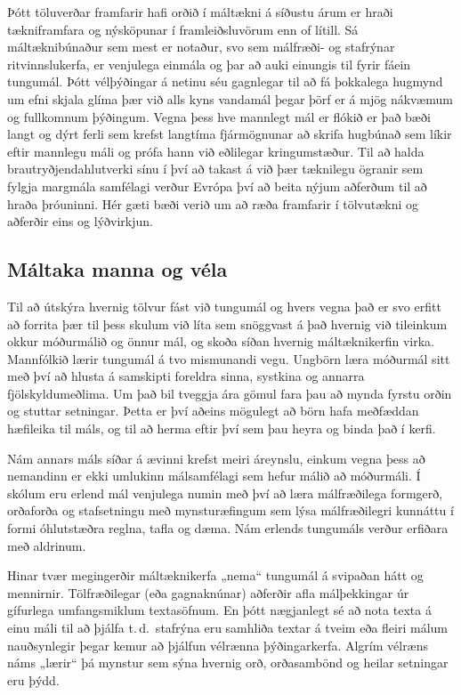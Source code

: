 \begin{multicols}{2}
Þótt töluverðar framfarir hafi orðið í máltækni á síðustu árum er hraði tækniframfara og nýsköpunar í framleiðsluvörum enn of lítill. Sá máltæknibúnaður sem mest er notaður, svo sem málfræði- og stafrýnar ritvinnslukerfa, er venjulega einmála og þar að auki einungis til fyrir fáein tungumál.
Þótt vélþýðingar á netinu séu gagnlegar til að fá þokkalega hugmynd um efni skjala glíma þær við alls kyns vandamál þegar þörf er á mjög nákvæmum og fullkomnum þýðingum. Vegna þess hve mannlegt mál er flókið er það bæði langt og dýrt ferli sem krefst langtíma fjármögnunar að skrifa hugbúnað sem líkir eftir mannlegu máli og prófa hann við eðlilegar kringumstæður. Til að halda brautryðjendahlutverki sínu í því að takast á við þær tæknilegu ögranir sem fylgja margmála samfélagi verður Evrópa því að beita nýjum aðferðum til að hraða þróuninni. Hér gæti bæði verið um að ræða framfarir í tölvutækni og aðferðir eins og lýðvirkjun.

\subsection{Máltaka manna og véla}

Til að útskýra hvernig tölvur fást við tungumál og hvers vegna það er svo erfitt að forrita þær til þess skulum við líta sem snöggvast á það hvernig við tileinkum okkur móðurmálið og önnur mál, og skoða síðan hvernig máltæknikerfin virka.
Mannfólkið lærir tungumál á tvo mismunandi vegu. Ungbörn læra móðurmál sitt með því að hlusta á samskipti foreldra sinna, systkina og annarra fjölskyldumeðlima. Um það bil tveggja ára gömul fara þau að mynda fyrstu orðin og stuttar setningar. Þetta er því aðeins mögulegt að börn hafa meðfæddan hæfileika til máls, og til að herma eftir því sem þau heyra og binda það í kerfi.

Nám annars máls síðar á ævinni krefst meiri áreynslu, einkum vegna þess að nemandinn er ekki umlukinn málsamfélagi sem hefur málið að móðurmáli. Í skólum eru erlend mál venjulega numin með því að læra málfræðilega formgerð, orðaforða og stafsetningu með mynsturæfingum sem lýsa málfræðilegri kunnáttu í formi óhlutstæðra reglna, tafla og dæma. Nám erlends tungumáls verður erfiðara með aldrinum.

Hinar tvær megingerðir máltæknikerfa „nema“ tungumál á svipaðan hátt og mennirnir. Tölfræðilegar (eða gagnaknúnar) aðferðir afla málþekkingar úr gífurlega umfangsmiklum textasöfnum. En þótt nægjanlegt sé að nota texta á einu máli til að þjálfa t.\,d.~stafrýna eru samhliða textar á tveim eða fleiri málum nauðsynlegir þegar kemur að þjálfun vélrænna þýðingarkerfa. Algrím vélræns náms „lærir“ þá mynstur sem sýna hvernig orð, orðasambönd og heilar setningar eru þýdd.


\end{multicols}
